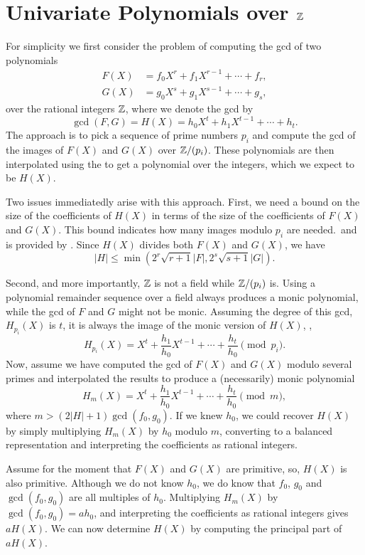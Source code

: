 \section{Univariate Polynomials over $\mathbb{Z}$}
\label{PGCD:Uni:Sec}

For simplicity we first consider the problem of computing the {\sc gcd} 
of two polynomials 
\[
\begin{aligned}
F(X) & = f_0 X^r + f_1 X^{r-1} + \cdots + f_r, \\
G(X) & = g_0 X^s + g_1 X^{s-1} + \cdots + g_s, 
\end{aligned}
\]
over the rational integers $\mathbb{Z}$,
where we denote the {\sc gcd} by 
\[
\gcd(F, G) = H(X) = h_0 X^t + h_1 X^{t-1} + \cdots + h_t.
\]  
The approach is to pick a sequence of prime numbers $p_i$ and compute the 
{\sc gcd} of the images of $F(X)$ and $G(X)$ over $\mathbb{Z}/(p_i)$.  These 
polynomials are then interpolated using the  to 
get a polynomial over the integers, which we expect to be $H(X)$. 

Two issues immediatedly arise with this approach.  First, we need a
bound on the size of the coefficients of $H(X)$ in terms of the size
of the coefficients of $F(X)$ and $G(X)$.  This bound indicates how many 
images modulo $p_i$ are needed.\, and is provided by 
.  Since $H(X)$ 
divides both $F(X)$ and $G(X)$, we have
\[
|H| \le \min( 2^r\sqrt{r+1} |F|, 2^s\sqrt{s+1} |G|).
\]

Second, and more importantly, $\mathbb{Z}$ is not a field while $\mathbb{Z}/(p_i)$ is.
Using a polynomial remainder sequence over a field always produces a
monic polynomial, while the {\sc gcd} of $F$ and $G$ might not be
monic.  Assuming the degree of this {\sc gcd}, $H_{p_i}(X)$ is $t$, it
is always the image of the monic version of $H(X)$, \ie,
\[
H_{p_i}(X) = X^t + \frac{h_1}{h_0} X^{t-1} + \cdots + \frac{h_t}{h_0}
    \pmod{p_i}.
\]
Now, assume we have computed the {\sc gcd} of $F(X)$ and $G(X)$ modulo
several primes and interpolated the results to produce a (necessarily) monic
polynomial
\[
H_m(X) = X^t + \frac{h_1}{h_0} X^{t-1} + \cdots + \frac{h_t}{h_0} \pmod{m},
\]
where $m > (2 |H| + 1) \gcd(f_0, g_0)$.  If we knew $h_0$, we could
recover $H(X)$ by simply multiplying $H_m(X)$ by $h_0$ modulo $m$,
converting to a balanced representation and interpreting the
coefficients as rational integers.

Assume for the moment that $F(X)$ and $G(X)$ are primitive, so, $H(X)$
is also primitive.  Although we do not know $h_0$, we do know that
$f_0$, $g_0$ and $\gcd(f_0, g_0)$ are all multiples of $h_0$.
Multiplying $H_m(X)$ by $\gcd(f_0, g_0) = a h_0$, and interpreting the
coefficients as rational integers gives $aH(X)$.  We can now determine
$H(X)$ by computing the principal part of $aH(X)$.

